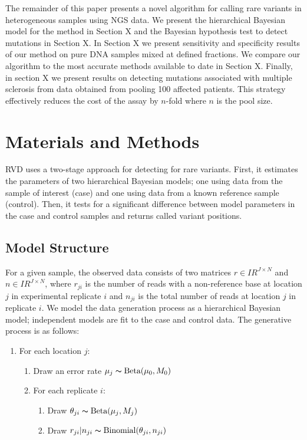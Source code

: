 \documentclass[11pt,reqno]{amsart}
\newcommand{\RR}{I\!\!R} %
\begin{document}
The remainder of this paper presents a novel algorithm for calling rare variants in heterogeneous samples using NGS data. We present the hierarchical Bayesian model for the method in Section X and the Bayesian hypothesis test to detect mutations in Section X. In Section X we present sensitivity and specificity results of our method on pure DNA samples mixed at defined fractions. We compare our algorithm to the most accurate methods available to date in Section X. Finally, in section X we present results on detecting mutations associated with multiple sclerosis from data obtained from pooling 100 affected patients. This strategy effectively reduces the cost of the assay by $n$-fold where $n$ is the pool size.

\section{Materials and Methods}

RVD uses a two-stage approach for detecting for rare variants. First, it estimates the parameters of two hierarchical Bayesian models; one using data from the sample of interest (case) and one using data from a known reference sample (control). Then, it tests for a significant difference between model parameters in the case and control samples and returns called variant positions.

\subsection{Model Structure}

For a given sample, the observed data consists of two matrices $r \in \RR^{J \times N}$ and $n \in \RR^{J \times N}$, where $r_{ji}$ is the number of reads with a non-reference base at location $j$ in experimental replicate $i$ and $n_{ji}$ is the total number of reads at location $j$ in replicate $i$. We model the data generation process as a hierarchical Bayesian model; independent models are fit to the case and control data. The generative process is as follows:

\begin{enumerate}[noitemsep]
	\item For each location $j$: 
	\begin{enumerate}
		\item Draw an error rate $\mu_j \thicksim \text{Beta}(\mu_0, M_0)$
		\item For each replicate $i$:
		\begin{enumerate}
			\item Draw $\theta_{ji} \thicksim \text{Beta}(\mu_j, M_j)$
			\item Draw $r_{ji} | n_{ji} \thicksim \text{Binomial}(\theta_{ji}, n_{ji})$
		\end{enumerate}
	\end{enumerate}
\end{enumerate}
\end{document}
